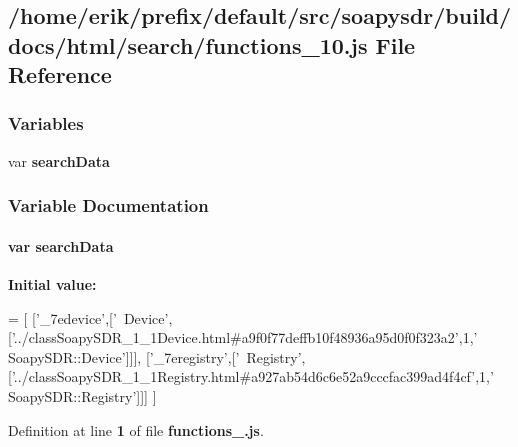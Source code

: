 \subsection{/home/erik/prefix/default/src/soapysdr/build/docs/html/search/functions\+\_\+10.js File Reference}
\label{functions__10_8js}
\subsubsection*{Variables}
\begin{DoxyCompactItemize}
\item 
var {\bf search\+Data}
\end{DoxyCompactItemize}


\subsubsection{Variable Documentation}
\paragraph[{search\+Data}]{\setlength{\rightskip}{0pt plus 5cm}var search\+Data}\label{functions__10_8js_ad01a7523f103d6242ef9b0451861231e}
{\bfseries Initial value\+:}
\begin{DoxyCode}
=
[
  [\textcolor{stringliteral}{'\_7edevice'},[\textcolor{stringliteral}{'~Device'},[\textcolor{stringliteral}{'../classSoapySDR\_1\_1Device.html#a9f0f77deffb10f48936a95d0f0f323a2'},1,\textcolor{stringliteral}{'
      SoapySDR::Device'}]]],
  [\textcolor{stringliteral}{'\_7eregistry'},[\textcolor{stringliteral}{'~Registry'},[\textcolor{stringliteral}{'../classSoapySDR\_1\_1Registry.html#a927ab54d6c6e52a9cccfac399ad4f4cf'},1,\textcolor{stringliteral}{'
      SoapySDR::Registry'}]]]
]
\end{DoxyCode}


Definition at line {\bf 1} of file {\bf functions\+\_.\+js}.

